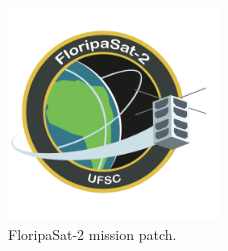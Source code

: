 \begin{figure}[!ht]
    \begin{center}
        \includegraphics[width=0.5\textwidth]{figures/floripasat2-patch.png}
        \caption{FloripaSat-2 mission patch.}
        \label{fig:mission-patch}
    \end{center}
\end{figure}
